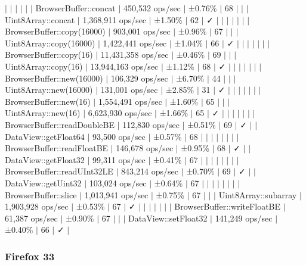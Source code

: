 $\vert$ $\vert$ $\vert$ $\vert$ $\vert$ $\vert$ Browser\+Buffer\+::concat $\vert$ 450,532 ops/sec $\vert$ ±0.76\% $\vert$ 68 $\vert$ $\vert$ $\vert$ Uint8\+Array\+::concat $\vert$ 1,368,911 ops/sec $\vert$ ±1.50\% $\vert$ 62 $\vert$ ✓ $\vert$ $\vert$ $\vert$ $\vert$ $\vert$ $\vert$ $\vert$ Browser\+Buffer\+::copy(16000) $\vert$ 903,001 ops/sec $\vert$ ±0.96\% $\vert$ 67 $\vert$ $\vert$ $\vert$ Uint8\+Array\+::copy(16000) $\vert$ 1,422,441 ops/sec $\vert$ ±1.04\% $\vert$ 66 $\vert$ ✓ $\vert$ $\vert$ $\vert$ $\vert$ $\vert$ $\vert$ $\vert$ Browser\+Buffer\+::copy(16) $\vert$ 11,431,358 ops/sec $\vert$ ±0.46\% $\vert$ 69 $\vert$ $\vert$ $\vert$ Uint8\+Array\+::copy(16) $\vert$ 13,944,163 ops/sec $\vert$ ±1.12\% $\vert$ 68 $\vert$ ✓ $\vert$ $\vert$ $\vert$ $\vert$ $\vert$ $\vert$ $\vert$ Browser\+Buffer\+::new(16000) $\vert$ 106,329 ops/sec $\vert$ ±6.70\% $\vert$ 44 $\vert$ $\vert$ $\vert$ Uint8\+Array\+::new(16000) $\vert$ 131,001 ops/sec $\vert$ ±2.85\% $\vert$ 31 $\vert$ ✓ $\vert$ $\vert$ $\vert$ $\vert$ $\vert$ $\vert$ $\vert$ Browser\+Buffer\+::new(16) $\vert$ 1,554,491 ops/sec $\vert$ ±1.60\% $\vert$ 65 $\vert$ $\vert$ $\vert$ Uint8\+Array\+::new(16) $\vert$ 6,623,930 ops/sec $\vert$ ±1.66\% $\vert$ 65 $\vert$ ✓ $\vert$ $\vert$ $\vert$ $\vert$ $\vert$ $\vert$ $\vert$ Browser\+Buffer\+::read\+Double\+BE $\vert$ 112,830 ops/sec $\vert$ ±0.51\% $\vert$ 69 $\vert$ ✓ $\vert$ $\vert$ Data\+View\+::get\+Float64 $\vert$ 93,500 ops/sec $\vert$ ±0.57\% $\vert$ 68 $\vert$ $\vert$ $\vert$ $\vert$ $\vert$ $\vert$ $\vert$ $\vert$ Browser\+Buffer\+::read\+Float\+BE $\vert$ 146,678 ops/sec $\vert$ ±0.95\% $\vert$ 68 $\vert$ ✓ $\vert$ $\vert$ Data\+View\+::get\+Float32 $\vert$ 99,311 ops/sec $\vert$ ±0.41\% $\vert$ 67 $\vert$ $\vert$ $\vert$ $\vert$ $\vert$ $\vert$ $\vert$ $\vert$ Browser\+Buffer\+::read\+U\+Int32\+LE $\vert$ 843,214 ops/sec $\vert$ ±0.70\% $\vert$ 69 $\vert$ ✓ $\vert$ $\vert$ Data\+View\+::get\+Uint32 $\vert$ 103,024 ops/sec $\vert$ ±0.64\% $\vert$ 67 $\vert$ $\vert$ $\vert$ $\vert$ $\vert$ $\vert$ $\vert$ $\vert$ Browser\+Buffer\+::slice $\vert$ 1,013,941 ops/sec $\vert$ ±0.75\% $\vert$ 67 $\vert$ $\vert$ $\vert$ Uint8\+Array\+::subarray $\vert$ 1,903,928 ops/sec $\vert$ ±0.53\% $\vert$ 67 $\vert$ ✓ $\vert$ $\vert$ $\vert$ $\vert$ $\vert$ $\vert$ $\vert$ Browser\+Buffer\+::write\+Float\+BE $\vert$ 61,387 ops/sec $\vert$ ±0.90\% $\vert$ 67 $\vert$ $\vert$ $\vert$ Data\+View\+::set\+Float32 $\vert$ 141,249 ops/sec $\vert$ ±0.40\% $\vert$ 66 $\vert$ ✓ $\vert$

\subsubsection*{Firefox 33}

